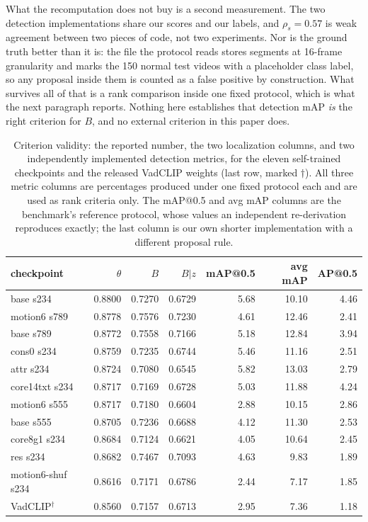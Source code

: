 \documentclass[number,preprint,12pt]{elsarticle}
\begin{document}
What the recomputation does not buy is a second measurement. The two detection
implementations share our scores and our labels, and \(\rho_s=0.57\) is weak
agreement between two pieces of code, not two experiments. Nor is the ground
truth better than it is: the file the protocol reads stores segments at 16-frame
granularity and marks the 150 normal test videos with a placeholder class label,
so any proposal inside them is counted as a false positive by construction. What
survives all of that is a rank comparison inside one fixed protocol, which is
what the next paragraph reports. Nothing here establishes that detection mAP
\emph{is} the right criterion for \(B\), and no external criterion in this paper does.

\begin{table}[t]
\centering
\caption{Criterion validity: the reported number, the two localization columns,
and two independently implemented detection metrics, for the eleven
self-trained checkpoints and the released VadCLIP weights (last row, marked
$\dagger$). All three metric columns are percentages produced under one fixed
protocol each and are used as rank criteria only. The mAP@0.5 and avg mAP
columns are the benchmark's reference protocol, whose values an independent
re-derivation reproduces exactly; the last column is our own shorter
implementation with a different proposal rule.}
\label{tab:criterion}
\footnotesize
\begin{tabular}{@{}lrrrrrr@{}}
\toprule
checkpoint & $\theta$ & $B$ & $B|z$ & mAP@0.5 & avg mAP & AP@0.5 \\
\midrule
base s234        & 0.8800 & 0.7270 & 0.6729 & 5.68 & 10.10 & 4.46 \\
motion6 s789     & 0.8778 & 0.7576 & 0.7230 & 4.61 & 12.46 & 2.41 \\
base s789        & 0.8772 & 0.7558 & 0.7166 & 5.18 & 12.84 & 3.94 \\
cons0 s234       & 0.8759 & 0.7235 & 0.6744 & 5.46 & 11.16 & 2.51 \\
attr s234        & 0.8724 & 0.7080 & 0.6545 & 5.82 & 13.03 & 2.79 \\
core14txt s234   & 0.8717 & 0.7169 & 0.6728 & 5.03 & 11.88 & 4.24 \\
motion6 s555     & 0.8717 & 0.7180 & 0.6604 & 2.88 & 10.15 & 2.86 \\
base s555        & 0.8705 & 0.7236 & 0.6688 & 4.12 & 11.30 & 2.53 \\
core8g1 s234     & 0.8684 & 0.7124 & 0.6621 & 4.05 & 10.64 & 2.45 \\
res s234         & 0.8682 & 0.7467 & 0.7093 & 4.63 & 9.83 & 1.89 \\
motion6-shuf s234 & 0.8616 & 0.7171 & 0.6786 & 2.44 & 7.17 & 1.85 \\
VadCLIP$^\dagger$ & 0.8560 & 0.7157 & 0.6713 & 2.95 & 7.36 & 1.18 \\
\bottomrule
\end{tabular}
\end{table}
\end{document}
